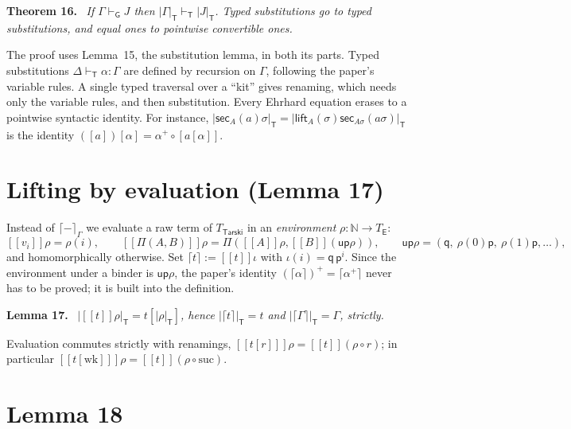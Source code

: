 \documentclass[11pt]{article}
\newenvironment{theorem}[1]{\par\medskip\noindent\textbf{Theorem #1.}\ \itshape}{\par\medskip}
\newenvironment{lemma}[1]{\par\medskip\noindent\textbf{Lemma #1.}\ \itshape}{\par\medskip}
\theoremstyle{definition}
\theoremstyle{remark}
\newcommand{\vdashG}{\vdash_{\mathsf G}}
\newcommand{\vdashT}{\vdash_{\mathsf T}}
\newcommand{\p}{\mathsf p}
\newcommand{\q}{\mathsf q}
\newcommand{\lift}{\mathsf{lift}}
\newcommand{\sect}{\mathsf{sec}}
\newcommand{\er}[1]{|#1|_{\mathsf T}}
\newcommand{\ev}[2]{[\![#1]\!]#2}
\newcommand{\up}{\mathsf{up}}
\newcommand{\idv}{\iota}
\begin{document}
\begin{theorem}{16}
If $\Gamma\vdashG J$ then $\er\Gamma\vdashT\er J$. Typed substitutions go to
typed substitutions, and equal ones to pointwise convertible ones.
\end{theorem}
The proof uses Lemma~15, the substitution lemma, in both its parts. Typed
substitutions $\Delta\vdashT\alpha:\Gamma$ are defined by recursion on
$\Gamma$, following the paper's variable rules. A single typed traversal over
a ``kit'' gives renaming, which needs only the variable rules, and then
substitution. Every Ehrhard equation erases to a pointwise syntactic
identity. For instance, $\er{\sect_A(a)\sigma}=\er{\lift_A(\sigma)\sect_{A\sigma}(a\sigma)}$
is the identity $([a])[\alpha]=\alpha^+\circ[a[\alpha]]$.

\section{Lifting by evaluation (Lemma 17)}

Instead of $\lceil-\rceil_\Gamma$ we evaluate a raw term of
$T_{\mathsf{Tarski}}$ in an \emph{environment} $\rho:\mathbb N\to T_{\mathsf E}$:
\[
\ev{v_i}\rho=\rho(i),\qquad
\ev{\Pi(A,B)}\rho=\Pi(\ev A\rho,\ev B{(\up\rho)}),\qquad
\up\rho=(\q,\ \rho(0)\p,\ \rho(1)\p,\dots),
\]
and homomorphically otherwise. Set
$\lceil t\rceil:=\ev t\idv$ with $\idv(i)=\q\,\p^i$.
Since the environment under a binder is $\up\rho$, the paper's identity
$(\lceil\alpha\rceil)^+=\lceil\alpha^+\rceil$ never has to be proved; it is
built into the definition.

\begin{lemma}{17}
$\er{\ev t\rho}=t[\er\rho]$, hence $\er{\lceil t\rceil}=t$ and
$\er{\lceil\Gamma\rceil}=\Gamma$, strictly.
\end{lemma}
Evaluation commutes strictly with renamings,
$\ev{t[r]}\rho=\ev t{(\rho\circ r)}$; in particular
$\ev{t[\mathrm{wk}]}\rho=\ev t{(\rho\circ\mathrm{suc})}$.

\section{Lemma 18}
\end{document}
